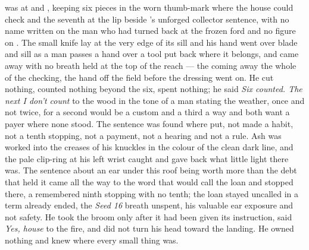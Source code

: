  was at  and , keeping six pieces in the worn thumb-mark where the house could check and the seventh at the lip beside 's unforged collector sentence, with no name written on the man who had turned back at the frozen ford and no figure on . The small knife lay at the very edge of its sill and his hand went over blade and sill as a man passes a hand over a tool put back where it belongs, and came away with no breath held at the top of the reach --- the coming away the whole of the checking, the hand off the field before the dressing went on. He cut nothing, counted nothing beyond the six, spent nothing; he said \emph{Six counted. The next I don’t count} to the wood in the tone of a man stating the weather, once and not twice, for a second would be a custom and a third a way and both want a payer where none stood. The sentence was found where put, not made a habit, not a tenth stopping, not a payment, not a hearing and not a rule. Ash was worked into the creases of his knuckles in the colour of the clean dark line, and the pale clip-ring at his left wrist caught and gave back what little light there was. The sentence about an ear under this roof being worth more than the debt that held it came all the way to the word that would call the loan and stopped there, a remembered ninth stopping with no tenth; the loan stayed uncalled in a term already ended, the \emph{Seed 16} breath unspent, his valuable ear exposure and not safety. He took the broom only after it had been given its instruction, said \emph{Yes, house} to the fire, and did not turn his head toward the landing. He owned nothing and knew where every small thing was.

